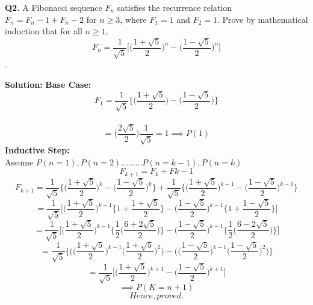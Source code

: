 \documentclass{article}
\begin{document}
\newpage

\begin {flushleft}
\textbf{Q2.} A Fibonacci sequence \(F_{n}\) satisfies the recurrence relation \( F_{n} = F_{n} - 1 + F_{n} - 2 \)  for \(n \geq 3\), where \(F_{1} = 1\)
and \(F_{2} = 1\). Prove by mathematical induction that for all \(n \geq 1\),
\newline
\newline
\[F_{n} = \frac{1}{\sqrt{5}}\Bigg[\Bigg( \frac{1 + \sqrt{5}}{2}\Bigg)^n - \Bigg( \frac{1 - \sqrt{5}}{2} \Bigg)^n  \Bigg]\].

\textbf{Solution: }
\newline
\newline
\tab[1.5cm]\textbf{Base Case: }
\newline
\[F_{1} = \frac{1}{\sqrt{5}} \Bigg\{ \Bigg( \frac{1+ \sqrt{5}}{2}\Bigg) - \Bigg( \frac{1- \sqrt{5}}{2}\Bigg)  \Bigg\}\]\\
\[= \Bigg( \frac{2\sqrt{5}}{2}\Bigg) \frac{1}{\sqrt{5}} = 1 \implies P(1)\]
\newline
\tab[1.5cm]\textbf{Inductive Step: }\\
\tab[1.5cm]Assume $P(n = 1), P(n = 2) ......... P(n = k - 1), P(n = k)$ 
\newline
\newline
{} \[ F_{k + 1} = F_{k} + F{k - 1}\]
 \[F_{k + 1} = \frac{1}{\sqrt{5}} \Bigg\{ \Bigg( \frac{1 + \sqrt{5}}{2}\Bigg)^k - \Bigg( \frac{1 - \sqrt{5}}{2}  \Bigg)^k \Bigg\} + \frac{1}{\sqrt{5}} \Bigg\{ \Bigg( \frac{1 + \sqrt{5}}{2}\Bigg)^{k - 1} - \Bigg( \frac{1 - \sqrt{5}}{2}  \Bigg)^{k - 1} \Bigg\} \]
\newline
\[ = \frac{1}{\sqrt{5}} \Bigg[ \bigg( \frac{1 + \sqrt{5}}{2} \bigg)^ {k - 1} \bigg\{ 1 + \frac{1 + \sqrt{5}}{2}\bigg\} - \bigg( \frac{1 - \sqrt{5}}{2}\bigg)^{k - 1} \bigg\{ 1 + \frac{1 - \sqrt{5}}{2} \bigg\} \Bigg]\]
\newline
\[ = \frac{1}{\sqrt{5}} \Bigg[ \bigg(\frac{1 + \sqrt{5}}{2} \bigg)^{k - 1} \bigg\{ \frac{1}{2} \bigg(   \frac{6 + 2\sqrt{5}}{2} \bigg) \bigg\} - \bigg(\frac{1 - \sqrt{5}}{2} \bigg)^{k - 1} \bigg\{ \frac{1}{2} \bigg(   \frac{6 - 2\sqrt{5}}{2} \bigg) \bigg\} \Bigg] \]
\newline
\[ = \frac{1}{\sqrt{5}} \Bigg\{ \Bigg( \bigg( \frac{1 + \sqrt{5}}{2} \bigg)^{k - 1} \bigg( \frac{1 + \sqrt{5}}{2} \bigg)^2 \Bigg)  - \Bigg( \bigg( \frac{1 - \sqrt{5}}{2} \bigg)^{k - 1} \bigg( \frac{1 - \sqrt{5}}{2} \bigg)^2 \Bigg) \Bigg\} \]
\newline
\[ = \frac{1}{\sqrt{5}} \Bigg[ \bigg( \frac{1 + \sqrt{5}}{2} \bigg) ^ {k + 1} - \bigg( \frac{1 - \sqrt{5}}{2} \bigg) ^ {k + 1} \bigg] \]
\newline
\[\implies P(K = n + 1) \]
\newline
\newline
\[Hence, proved.\]


\end {flushleft}
\end{document}
